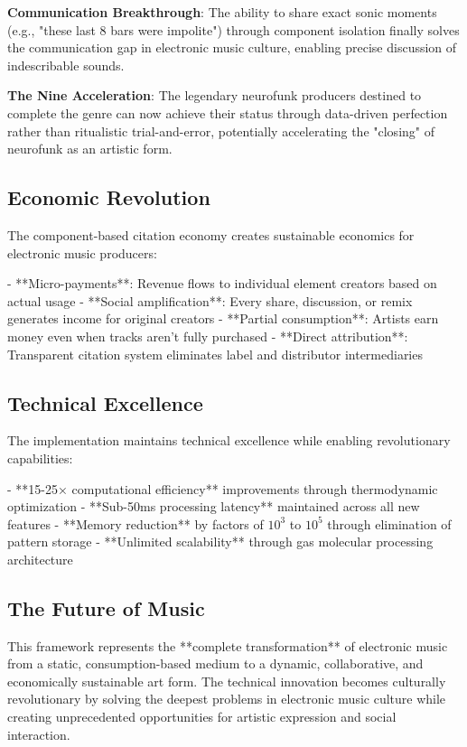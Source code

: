 \documentclass[12pt,a4paper]{article}
\begin{document}
\textbf{Communication Breakthrough}: The ability to share exact sonic moments (e.g., "these last 8 bars were impolite") through component isolation finally solves the communication gap in electronic music culture, enabling precise discussion of indescribable sounds.

\textbf{The Nine Acceleration}: The legendary neurofunk producers destined to complete the genre can now achieve their status through data-driven perfection rather than ritualistic trial-and-error, potentially accelerating the "closing" of neurofunk as an artistic form.

\subsection{Economic Revolution}

The component-based citation economy creates sustainable economics for electronic music producers:

- **Micro-payments**: Revenue flows to individual element creators based on actual usage
- **Social amplification**: Every share, discussion, or remix generates income for original creators  
- **Partial consumption**: Artists earn money even when tracks aren't fully purchased
- **Direct attribution**: Transparent citation system eliminates label and distributor intermediaries

\subsection{Technical Excellence}

The implementation maintains technical excellence while enabling revolutionary capabilities:

- **15-25× computational efficiency** improvements through thermodynamic optimization
- **Sub-50ms processing latency** maintained across all new features
- **Memory reduction** by factors of $10^3$ to $10^5$ through elimination of pattern storage
- **Unlimited scalability** through gas molecular processing architecture

\subsection{The Future of Music}

This framework represents the **complete transformation** of electronic music from a static, consumption-based medium to a dynamic, collaborative, and economically sustainable art form. The technical innovation becomes culturally revolutionary by solving the deepest problems in electronic music culture while creating unprecedented opportunities for artistic expression and social interaction.
\end{document}
